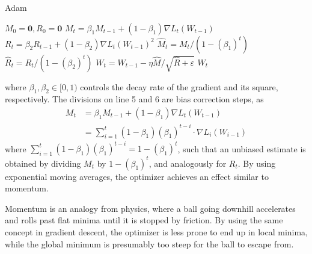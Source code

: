         {\centering
        \begin{minipage}{.6\textwidth}
            \begin{algorithm}[H]
            \caption{Adam}
            \label{alg:mopt-adam}
            \begin{algorithmic}[1]
                \STATE $M_0 = \bm{0}, R_0 = \bm{0}$
                    \STATE $M_t = \beta_1 M_{t-1} + (1-\beta_1) \nabla L_t(W_{t-1})$
                    \STATE $R_t = \beta_2 R_{t-1} + (1-\beta_2) \nabla L_t(W_{t-1})^2$
                    \STATE $\hat{M}_t = M_t / (1-(\beta_1)^t)$
                    \STATE $\hat{R}_t = R_t / (1-(\beta_2)^t)$
                    \STATE $W_t = W_{t-1} - \eta \hat{M} / \sqrt{\hat{R}+\varepsilon}$
                \ENDFOR
                \RETURN $W_t$
            \end{algorithmic}
            \end{algorithm}
        \end{minipage}
        \par}
        where $\beta_1,\beta_2\in [0,1)$ controls the decay rate of the gradient and its square, respectively. The divisions on line 5 and 6 are bias correction steps, as
        \begin{equation}
            \begin{split}
                M_t &= \beta_1 M_{t-1}+(1-\beta_1)\nabla L_t(W_{t-1}) \\
                &= \sum_{i=1}^t (1-\beta_1)(\beta_1)^{t-i} \cdot \nabla L_i(W_{i-1})
            \end{split}
        \end{equation}
        where $\sum_{i=1}^t(1-\beta_1)(\beta_1)^{t-i} = 1-(\beta_1)^t$, such that an unbiased estimate is obtained by dividing $M_t$ by $1-(\beta_1)^t$, and analogously for $R_t$.
        By using exponential moving averages, the optimizer achieves an effect similar to momentum.
        
        
        Momentum is an analogy from physics, where a ball going downhill accelerates and rolls past flat minima until it is stopped by friction. By using the same concept in gradient descent, the optimizer is less prone to end up in local minima, while the global minimum is presumably too steep for the ball to escape from.

